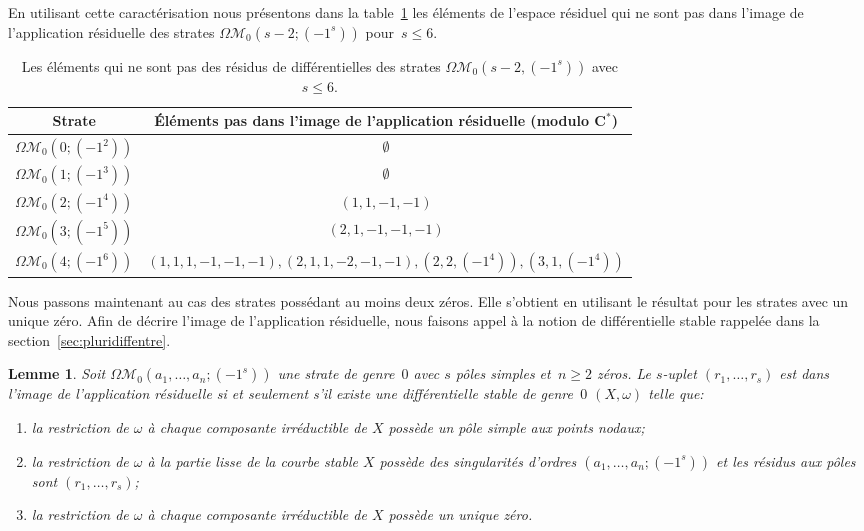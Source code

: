 \documentclass[JEP,XML,SOM,Unicode,francais,NoFloatCountersInSection,published]{cedram}
\let\mathcal\mathscr
\newcommand{\CC}{\mathbf{C}}
\newcommand{\omoduli}[1][g]{{\Omega\mathcal M}_{\!#1}}
\newtheorem{lem}[thm]{Lemme}
\theoremstyle{definition}
\begin{document}
En utilisant cette caractérisation nous présentons dans la table~\ref{tab:noim} les éléments de l'espace résiduel qui ne sont pas dans l'image de l'application résiduelle des strates $\omoduli[0](s-2;(-1^{s}))$ pour~$s\leq6$.
\par
\begin{table}[ht]
\smaller\renewcommand{\arraystretch}{1.3}
\begin{tabular}{|c|c|}
\hline
Strate & Éléments pas dans l'image de l'application résiduelle (modulo $\CC^{\ast}$)
\\
\hline
$\omoduli[0](0;(-1^{2}))$ & $\emptyset$ \\
\hline
$\omoduli[0](1;(-1^{3}))$ & $\emptyset$ \\
\hline
$\omoduli[0](2;(-1^{4}))$ & $(1,1,-1,-1)$ \\
\hline
$\omoduli[0](3;(-1^{5}))$ & $(2,1,-1,-1,-1)$ \\
\hline
$\omoduli[0](4;(-1^{6}))$& $(1,1,1,-1,-1,-1), (2,1,1,-2,-1,-1), (2,2,(-1^{4})), (3,1,(-1^{4}))$ \\
\hline
\end{tabular}
\vspace*{\baselineskip}
\caption{\label{tab:noim}Les éléments qui ne sont pas des résidus de différentielles des strates $\omoduli[0](s-2,(-1^{s}))$ avec $s\leq6$.}
\end{table}

Nous passons maintenant au cas des strates possédant au moins deux zéros. Elle s'obtient en utilisant le résultat pour les strates avec un unique zéro. Afin de décrire l'image de l'application résiduelle, nous faisons appel à la notion de différentielle stable rappelée dans la section~\ref{sec:pluridiffentre}.

\begin{lem}\label{lm:g0p-1plusieurszero}
Soit $\omoduli[0](a_{1},\dots,a_{n};(-1^{s}))$ une strate de genre~$0$ avec $s$ pôles simples et~$n\geq2$ zéros. Le $s$-uplet $(r_{1},\ldots,r_{s})$ est dans l'image de l'application résiduelle si et seulement s'il existe une différentielle stable de genre~$0$ $(X,\omega)$ telle que:
\begin{enumerate}
\item la restriction de $\omega$ à chaque composante irréductible de $X$ possède un pôle simple aux points nodaux;
\item la restriction de $\omega$ à la partie lisse de la courbe stable $X$ possède des singularités d'ordres $(a_{1},\dots,a_{n};(-1^{s}))$ et les résidus aux pôles sont $(r_{1},\dots,r_{s})$;
\item la restriction de $\omega$ à chaque composante irréductible de $X$ possède un unique zéro.
\end{enumerate}
\end{lem}
\end{document}
